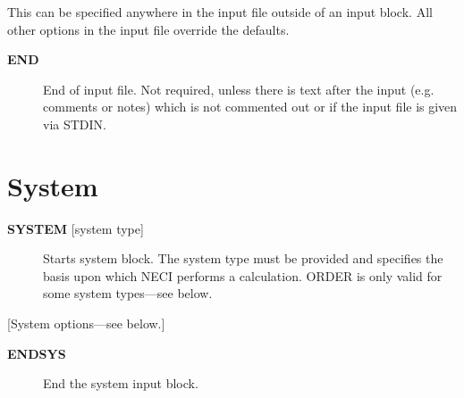 \documentclass[openany,a4paper,10pt,english]{manual}
\begin{document}
This can be specified anywhere in the input file outside of an input block.  All other options in the input file override the defaults.
\begin{description}
\item[\textbf{END}] \leavevmode
End of input file.  Not required, unless there is text after the input (e.g. comments or notes) which is not commented out or if the input file is given via STDIN.

\end{description}

\resetcurrentobjects
\hypertarget{--doc-input/system}{}

\hypertarget{input-system}{}\section{System}
\begin{description}
\item[\textbf{SYSTEM} {[}system type{]}] \leavevmode
Starts system block.  The system type must be provided and specifies
the basis upon which NECI performs a calculation.  ORDER is only valid
for some system types---see below.

\end{description}

{[}System options---see below.{]}
\begin{description}
\item[\textbf{ENDSYS}] \leavevmode
End the system input block.

\end{description}
\end{document}
